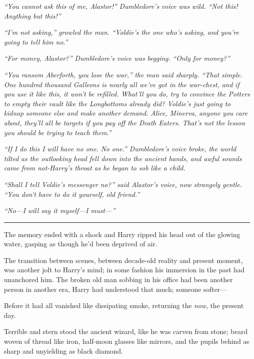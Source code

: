 \emph{``You cannot ask this of me, Alastor!'' Dumbledore's voice was
wild. ``Not this! Anything but this!''}

\emph{``I'm not asking,'' growled the man. ``Voldie's the one who's
asking, and you're going to tell him no.''}

\emph{``For money, Alastor?'' Dumbledore's voice was begging. ``Only for
money?''}

\emph{``You ransom Aberforth, you lose the war,'' the man said sharply.
``That simple. One hundred thousand Galleons is nearly all we've got in
the war-chest, and if you use it like this, it won't be refilled.
What'll you do, try to convince the Potters to empty their vault like
the Longbottoms already did? Voldie's just going to kidnap someone else
and make another demand. Alice, Minerva, anyone you care about, they'll
all be targets if you pay off the Death Eaters. That's not the lesson
you should be trying to teach them.''}

\emph{``If I do this I will have no one. No one.'' Dumbledore's voice
broke, the world tilted as the outlooking head fell down into the
ancient hands, and awful sounds came from not-Harry's throat as he began
to sob like a child.}

\emph{``Shall I tell Voldie's messenger no?'' said Alastor's voice, now
strangely gentle. ``You don't have to do it yourself, old friend.''}

\emph{``No---I will say it myself---I must---''}

\begin{center}\rule{3in}{0.4pt}\end{center}

The memory ended with a shock and Harry ripped his head out of the
glowing water, gasping as though he'd been deprived of air.

The transition between scenes, between decade-old reality and present
moment, was another jolt to Harry's mind; in some fashion his immersion
in the past had unanchored him. The broken old man sobbing in his office
had been another person in another era, Harry had understood that much;
someone softer---

Before it had all vanished like dissipating smoke, returning the
\emph{now,} the present day.

Terrible and stern stood the ancient wizard, like he was carven from
stone; beard woven of thread like iron, half-moon glasses like mirrors,
and the pupils behind as sharp and unyielding as black diamond.

